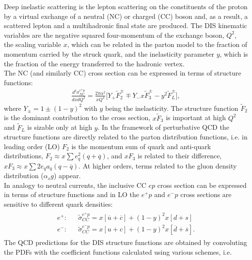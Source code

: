 Deep inelastic scattering is the lepton scattering on the 
constituents of the proton by a virtual exchange of a neutral (NC) 
or charged (CC) boson and, as a result, a scattered lepton and a 
multihadronic final state are produced.
The DIS kinematic variables are the negative squared four-momentum of 
the exchange boson, $Q^2$, the 
scaling variable $x$, which can be related in the parton model to 
the fraction of momentum carried by the struck quark, and the 
inelasticity parameter $y$, which is the fraction of the energy 
transferred to the hadronic vertex. 
\\
%
The NC (and similarly CC) cross section can be expressed in terms of structure functions:
\begin{eqnarray}
  \nonumber
   \frac{d^2\sigma_{NC}^{e^{\pm} p}}{dxdQ^2}=\frac{2\pi\alpha^2}{xQ^4} 
     \big [ Y_{+} \tilde F_2^{\pm} \mp Y_{-}x \tilde F_3^{\pm} - y^2 \tilde F_L^{\pm} \big ],
\end{eqnarray}
where $Y_{\pm} = 1 \pm (1-y)^2$ with $y$ being the inelasticity. The structure function $\tilde F_2$
is the dominant contribution to the cross section, $x \tilde F_3$ is important at high $Q^2$ and $\tilde F_L$ is sizable 
only at high $y$. 
In the framework of perturbative QCD the structure functions are directly related to the 
parton distribution functions, i.e. in leading order (LO)  $F_2$ is the momentum sum of quark and anti-quark distributions, 
$F_2 \approx x \sum e^2_q (q+ \overline q)$, and $xF_3$ is related to their difference, 
    $xF_3 \approx x \sum 2e_q a_q (q- \overline q)$. At higher orders, terms related to the gluon density distribution
($\alpha_s g$) appear.
\\
In analogy to neutral currents, the inclusive CC $ep$ cross section can be expressed 
in terms of structure functions and in LO the $e^+p$ and $e^-p$ cross sections are sensitive to different quark 
densities:
\begin{eqnarray}
  \nonumber
    \begin{array}{rll}
   e^{+}:  & & \tilde \sigma_{CC}^{e^{+} p} = 
                x[\overline u +\overline c] + (1-y)^2 x[ d+s ]  \\
   e^{-}:  & & \tilde \sigma_{CC}^{e^{-} p} = 
                x[ u +c] + (1-y)^2 x[\overline d +\overline s ].
    \end{array}
\end{eqnarray}
%
The QCD predictions for the DIS structure functions are obtained by convoluting 
the PDFs with the coefficient functions calculated using various schemes, i.e.
